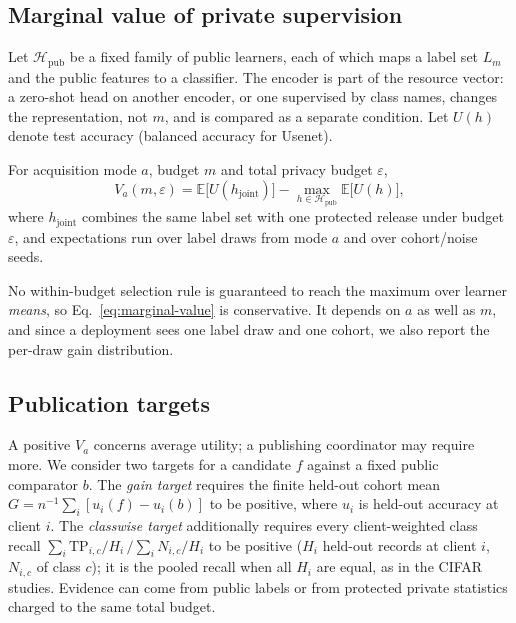 \subsection{Marginal value of private supervision}

Let $\mathcal H_{\mathrm{pub}}$ be a fixed family of public learners, each of
which maps a label set $L_m$ and the public features to a classifier. The
encoder is part of the resource vector: a zero-shot head on another
encoder, or one supervised by class names, changes the representation, not
$m$, and is compared as a separate condition. Let
$U(h)$ denote test accuracy (balanced accuracy for Usenet).

\begin{definition}
\label{def:value}
For acquisition mode $a$, budget $m$ and total privacy budget $\varepsilon$,
\begin{equation}
V_a(m,\varepsilon)=\mathbb E\bigl[U(h_{\mathrm{joint}})\bigr]
-\max_{h\in\mathcal H_{\mathrm{pub}}}\mathbb E\bigl[U(h)\bigr],
\label{eq:marginal-value}
\end{equation}
where $h_{\mathrm{joint}}$ combines the same label set with one protected
release under budget $\varepsilon$, and expectations run over label draws
from mode $a$ and over cohort/noise seeds.
\end{definition}

No within-budget selection rule is guaranteed to reach the maximum over
learner \emph{means}, so Eq.~\eqref{eq:marginal-value} is conservative. It
depends on $a$ as well as $m$, and since a deployment sees one label draw and
one cohort, we also report the per-draw gain distribution.

\subsection{Publication targets}

A positive $V_a$ concerns average utility; a publishing coordinator may
require more. We consider two targets for a candidate $f$ against a fixed public comparator $b$. The \emph{gain target}
requires the finite held-out cohort mean $G=n^{-1}\sum_i
[u_i(f)-u_i(b)]$ to be positive, where $u_i$ is held-out accuracy at client
$i$. The \emph{classwise target} additionally requires every client-weighted
class recall $\sum_i \mathrm{TP}_{i,c}/H_i\,/\sum_i N_{i,c}/H_i$ to be positive
($H_i$ held-out records at client $i$, $N_{i,c}$ of class $c$); it is the
pooled recall when all $H_i$ are equal, as in the CIFAR studies. Evidence can come from public labels or from protected private statistics
charged to the same total budget.



